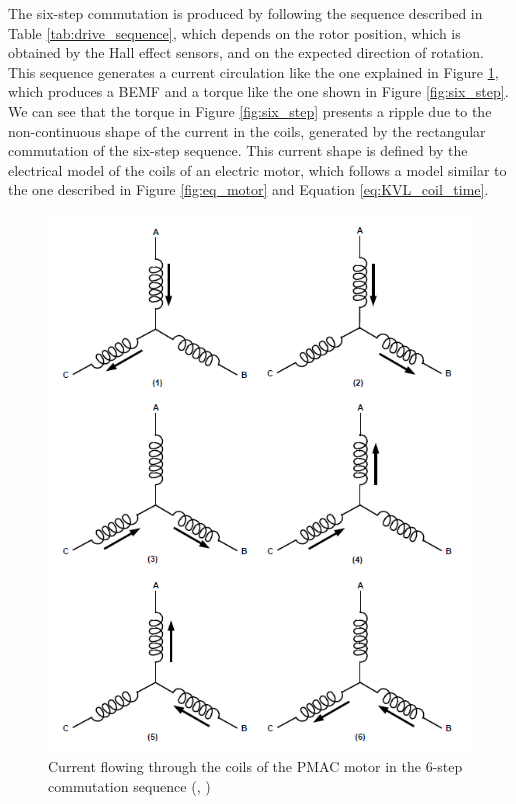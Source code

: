The six-step commutation is produced by following the sequence described in Table \ref{tab:drive_sequence}, which depends on the rotor position, which is obtained by the Hall effect sensors, and on the expected direction of rotation. This sequence generates a current circulation like the one explained in Figure \ref{fig:six_step_coils}, which produces a \ac{BEMF} and a torque like the one shown in Figure \ref{fig:six_step}. We can see that the torque in Figure \ref{fig:six_step} presents a ripple due to the non-continuous shape of the current in the coils, generated by the rectangular commutation of the six-step sequence. This current shape is defined by the electrical model of the coils of an electric motor, which follows a model similar to the one described in Figure \ref{fig:eq_motor} and Equation \ref{eq:KVL_coil_time}.

\begin{figure}[htbp]
\centering
\includegraphics[width=\textwidth]{Images/6step_coils.png} 
\caption[Six Step Commutation Currents]{Current flowing through the coils of the PMAC motor in the 6-step commutation sequence (\citeauthor{microchipBLDC}, \citeyear{microchipBLDC})}
\label{fig:six_step_coils}
\end{figure}

